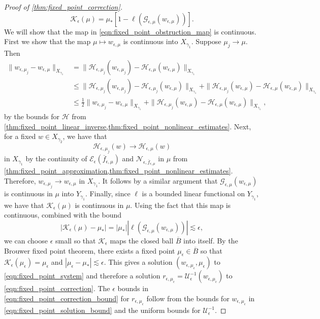 \documentclass[11pt]{amsart}
\theoremstyle{definition}
\theoremstyle{remark}
\numberwithin{equation}{section}
\newcommand{\mc}[1]{\mathcal{#1}}
\newcommand{\ov}[1]{\overline{#1}}
\begin{document}
\begin{proof}[Proof of \cref{thm:fixed_point_correction}]
\begin{equation}\label{eqn:fixed_point_obstruction_map}
\mc{K}_\epsilon(\mu) = \mu_*[1 - \ell(\mc{G}_{\epsilon, \mu}(w_{\epsilon, \mu}))].
\end{equation}  
We will show that the map in \eqref{eqn:fixed_point_obstruction_map} is continuous. First we show that the map $\mu \mapsto w_{\epsilon, \mu}$ is continuous into $X_{\gamma_1}$. Suppose $\mu_j \to \mu$. Then 
\begin{align*}
    \|w_{\epsilon, \mu_j} - w_{\epsilon, \mu}\|_{X_{\gamma_1}} & = \|\mc{H}_{\epsilon, \mu_j}(w_{\epsilon, \mu_j}) - \mc{H}_{\epsilon, \mu}(w_{\epsilon, \mu})\|_{X_{\gamma_1}} \\
    & \leq \|\mc{H}_{\epsilon, \mu_j}(w_{\epsilon, \mu_j}) - \mc{H}_{\epsilon, \mu_j}(w_{\epsilon, \mu})\|_{X_{\gamma_1}} + \|\mc{H}_{\epsilon, \mu_j}(w_{\epsilon, \mu}) - \mc{H}_{\epsilon, \mu}(w_{\epsilon, \mu})\|_{X_{\gamma_1}} \\
    & \leq \frac{1}{2}\|w_{\epsilon, \mu_j} - w_{\epsilon, \mu}\|_{X_{\gamma_1}} + \|\mc{H}_{\epsilon, \mu_j}(w_{\epsilon, \mu}) - \mc{H}_{\epsilon, \mu}(w_{\epsilon, \mu})\|_{X_{\gamma_1}},
\end{align*}
by the bounds for $\mc{H}$ from \cref{thm:fixed_point_linear_inverse,thm:fixed_point_nonlinear_estimates}. Next, for a fixed $w \in X_{\gamma_2}$, we have that 
\[\mc{H}_{\epsilon, \mu_j}(w) \to \mc{H}_{\epsilon, \mu}(w)\]
in $X_{\gamma_1}$ by the continuity of $\mc{E}_\epsilon(\ov{f}_{\epsilon, \mu})$ and $\mc{N}_{\epsilon, \ov{f}_{\epsilon, \mu}}$ in $\mu$ from \cref{thm:fixed_point_approximation,thm:fixed_point_nonlinear_estimates}. Therefore, $w_{\epsilon, \mu_j} \to w_{\epsilon, \mu}$ in $X_{\gamma_1}$. It follows by a similar argument that $\mc{G}_{\epsilon, \mu}(w_{\epsilon, \mu})$ is continuous in $\mu$ into $Y_{\gamma_1}$. Finally, since $\ell$ is a bounded linear functional on $Y_{\gamma_1}$, we have that $\mc{K}_\epsilon(\mu)$ is continuous in $\mu$. Using the fact that this map is continuous, combined with the bound
\begin{equation}\label{eqn:fixed_point_obstruction_bound}
|\mc{K}_\epsilon(\mu) - \mu_*| = |\mu_*||\ell(\mc{G}_{\epsilon, \mu}(w_{\epsilon, \mu}))| \lesssim \epsilon,
\end{equation}
we can choose $\epsilon$ small so that $\mc{K}_\epsilon$ maps the closed ball $\ov{B}$ into itself. By the Brouwer fixed point theorem, there exists a fixed point $\mu_\epsilon \in \ov{B}$ so that $\mc{K}_\epsilon(\mu_\epsilon) = \mu_\epsilon$ and $|\mu_\epsilon - \mu_*| \lesssim \epsilon$. This gives a solution $(w_{\epsilon, \mu_\epsilon}, \mu_\epsilon)$ to \eqref{eqn:fixed_point_system} and therefore a solution $r_{\epsilon, \mu_\epsilon} = \mc{U}_\epsilon^{-1}(w_{\epsilon, \mu_\epsilon})$ to \eqref{eqn:fixed_point_correction}. The $\epsilon$ bounds in \eqref{eqn:fixed_point_correction_bound} for $r_{\epsilon, \mu_\epsilon}$ follow from the bounds for $w_{\epsilon, \mu_\epsilon}$ in \eqref{eqn:fixed_point_solution_bound} and the uniform bounds for $\mc{U}_\epsilon^{-1}$.
\end{proof}
\end{document}
